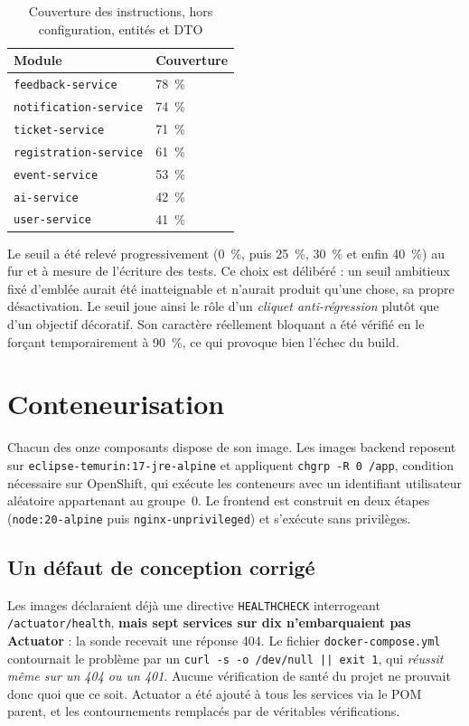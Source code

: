 \begin{table}[H]\centering\renewcommand{\arraystretch}{1.25}
\begin{tabular}{|p{5.5cm}|p{3cm}|}\hline
\rowcolor{gray!15}\textbf{Module} & \textbf{Couverture} \\ \hline
\texttt{feedback-service} & 78~\% \\ \hline
\texttt{notification-service} & 74~\% \\ \hline
\texttt{ticket-service} & 71~\% \\ \hline
\texttt{registration-service} & 61~\% \\ \hline
\texttt{event-service} & 53~\% \\ \hline
\texttt{ai-service} & 42~\% \\ \hline
\texttt{user-service} & 41~\% \\ \hline
\end{tabular}
\caption{Couverture des instructions, hors configuration, entités et DTO}\label{tab:couverture}
\end{table}

Le seuil a été relevé progressivement (0~\%, puis 25~\%, 30~\% et enfin 40~\%) au fur et à
mesure de l'écriture des tests. Ce choix est délibéré : un seuil ambitieux fixé d'emblée
aurait été inatteignable et n'aurait produit qu'une chose, sa propre désactivation. Le
seuil joue ainsi le rôle d'un \emph{cliquet anti-régression} plutôt que d'un objectif
décoratif. Son caractère réellement bloquant a été vérifié en le forçant temporairement à
90~\%, ce qui provoque bien l'échec du build.

\section{Conteneurisation}

Chacun des onze composants dispose de son image. Les images backend reposent sur
\texttt{eclipse-temurin:17-jre-alpine} et appliquent \texttt{chgrp -R 0 /app}, condition
nécessaire sur OpenShift, qui exécute les conteneurs avec un identifiant utilisateur
aléatoire appartenant au groupe~0. Le frontend est construit en deux étapes
(\texttt{node:20-alpine} puis \texttt{nginx-unprivileged}) et s'exécute sans privilèges.

\subsection{Un défaut de conception corrigé}
Les images déclaraient déjà une directive \texttt{HEALTHCHECK} interrogeant
\texttt{/actuator/health}, \textbf{mais sept services sur dix n'embarquaient pas Actuator} :
la sonde recevait une réponse 404. Le fichier \texttt{docker-compose.yml} contournait le
problème par un \texttt{curl -s -o /dev/null || exit 1}, qui \emph{réussit même sur un 404
ou un 401}. Aucune vérification de santé du projet ne prouvait donc quoi que ce soit.
Actuator a été ajouté à tous les services via le POM parent, et les contournements
remplacés par de véritables vérifications.

